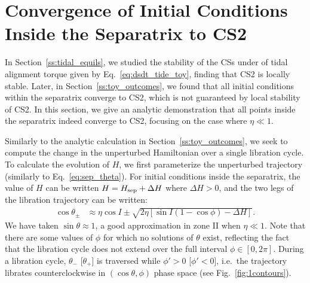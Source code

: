 \documentclass[
        fleqn,
        usenatbib,
    ]{mnras}
\newcommand*{\p}[1]{\left(#1\right)}
\newcommand*{\s}[1]{\left[#1\right]}
\begin{document}



\appendix

\onecolumn

\section{Convergence of Initial Conditions Inside the Separatrix to CS2
}\label{app:cs_stab2}

In Section~\ref{ss:tidal_equils}, we studied the stability of the CSs under of
tidal alignment torque given by Eq.~\eqref{eq:dsdt_tide_toy}, finding that CS2
is locally stable. Later, in Section~\ref{ss:toy_outcomes}, we found that all
initial conditions within the separatrix converge to CS2, which is not
guaranteed by local stability of CS2. In this section, we give an analytic
demonstration that all points inside the separatrix indeed converge to CS2,
focusing on the case where $\eta \ll 1$.

Similarly to the analytic calculation in Section~\ref{ss:toy_outcomes}, we seek
to compute the change in the unperturbed Hamiltonian over a single libration
cycle. To calculate the evolution of $H$, we first parameterize the unperturbed
trajectory (similarly to Eq.~\ref{eq:sep_theta}). For initial conditions inside
the separatrix, the value of $H$ can be written $H = H_{\rm sep} + \Delta H$
where $\Delta H > 0$, and the two legs of the libration trajectory can be
written:
\begin{align}
    \cos \theta_{\pm} &\approx
        \eta \cos I \pm \sqrt{2\eta\s{\sin I\p{1 - \cos \phi} - \Delta H}}.
        \label{eq:lib_cycle_toy}
\end{align}
We have taken $\sin \theta \approx 1$, a good approximation in zone II when
$\eta \ll 1$. Note that there are some values of $\phi$ for which no solutions
of $\theta$ exist, reflecting the fact that the libration cycle does not extend
over the full interval $\phi \in [0, 2\pi]$. During a libration cycle,
$\theta_-$ [$\theta_+$] is traversed while $\phi' > 0$ [$\phi' < 0$], i.e.\ the
trajectory librates counterclockwise in $(\cos \theta, \phi)$ phase space (see
Fig.~\ref{fig:1contours}).
\end{document}
